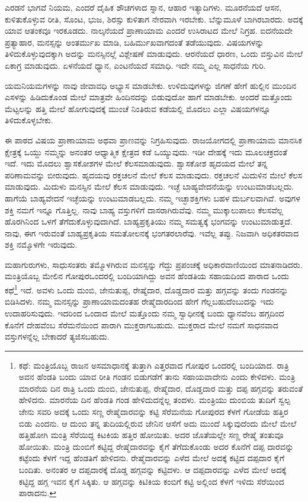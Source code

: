 ಎರಡನೆ ಭಾಗವೆ ನಿಯಮ, ಎಂದರೆ ದೈಹಿಕ ಶೌಚಗಳಾದ ಸ್ನಾನ, ಆಹಾರ ಇತ್ಯಾದಿಗಳು. ಮೂರನೆಯದೆ ಆಸನ, ಕುಳಿತುಕೊಳ್ಳುವ ರೀತಿ, ಸೊಂಟ, ಭುಜ, ಶಿರಸ್ಸು ಕುಳಿತಾಗ ನೇರವಾಗಿ ಇರಬೇಕು. ಬೆನ್ನುಮೂಳೆ ಬಾಗಿರಬಾರದು. ಅದಕ್ಕೆ ಯಾವ ಆತಂಕವೂ ಇರಕೂಡದು. ನಾಲ್ಕನೆಯದೆ ಪ್ರಾಣಾಯಾಮ ಎಂದರೆ ಉಸಿರಾಟದ ಮೇಲೆ ನಿಗ್ರಹ. ಐದನೆಯದೇ ಪ್ರತ್ಯಾಹಾರ, ಮನಸ್ಸನ್ನು ಅಂತರ್ಮುಖ ಮಾಡಿ, ಬಹಿರ್ಮುಖವಾಗದಂತೆ ತಡೆಯುವುದು. ವಿಷಯಗಳನ್ನು ತಿಳಿದುಕೊಳ್ಳುವುದಕ್ಕಾಗಿ ಅದನ್ನು ಮನಸ್ಸಿನಲ್ಲೆ ವಿಶ್ಲೇಷಣೆ ಮಾಡುವುದು. ಆರನೆಯದೆ ಧಾರಣ, ಒಂದು ವಸ್ತುವಿನ ಮೇಲೆ ಏಕಾಗ್ರ ಮಾಡುವುದು. ಏಳನೆಯದೆ ಧ್ಯಾನ, ಎಂಟನೆಯದೆ ಸಮಾಧಿ. ಇದೇ ನಮ್ಮ ಎಲ್ಲ ಸಾಧನೆಯ ಗುರಿ.

\vskip 2pt

ಯಮನಿಯಮಗಳನ್ನು ನಾವು ಜೀವಾವಧಿ ಅಭ್ಯಾಸ ಮಾಡಬೇಕು. ಉಳಿದುವುಗಳನ್ನು ಜಿಗಣೆ ಹೇಗೆ ಹುಲ್ಲಿನ ಮುಂದಿನ ಎಸಳನ್ನು ಹಿಡಿದುಕೊಂಡ ಮೇಲೆ ಮಾತ್ರವೇ ಹಿಂದಿನದನ್ನು ಬಿಡುವುದೋ ಹಾಗೆ ಮಾಡಬೇಕು. ಅಂದರೆ ಮತ್ತೊಂದು ಮೆಟ್ಟಲನ್ನು ಹತ್ತಿ ಮೇಲೆ ಹೋಗುವುದಕ್ಕೆ ಮುಂಚೆ ನಿಂತಿರುವ ಕಡೆಯಲ್ಲಿ ಮೊದಲು ಎಲ್ಲಾ ವಿಷಯಗಳನ್ನೂ ತಿಳಿದುಕೊಳ್ಳಬೇಕು.

\vskip 2pt

ಈ ಪಾಠದ ವಿಷಯ ಪ್ರಾಣಾಯಾಮ ಅಥವಾ ಪ್ರಾಣವನ್ನು ನಿಗ್ರಹಿಸುವುದು. ರಾಜಯೋಗದಲ್ಲಿ ಪ್ರಾಣಾಯಾಮ ಮಾನಸಿಕ ಕ್ಷೇತ್ರಕ್ಕೆ ಒಯ್ದು ನಮ್ಮನ್ನು ಅನಂತರ ಆಧ್ಯಾತ್ಮಿಕ ಕ್ಷೇತ್ರದ ಕಡೆ ಒಯ್ಯುವುದು. ಇಡೀ ದೇಹಕ್ಕೆ ಇದು ಮೂಲಚಕ್ರದಂತೆ ಇದೆ. ಇದು ಮೊದಲು ಶ್ವಾಸಕೋಶಗಳ ಮೇಲೆ ಕೆಲಸಮಾಡುವುದು. ಶ್ವಾಸಕೋಶ ಹೃದಯದ ಮೇಲೆ ತನ್ನ ಪರಿಣಾಮವನ್ನು ಬೀರುವುದು. ಹೃದಯವು ರಕ್ತಚಲನೆ ಮೇಲೆ ಕೆಲಸ ಮಾಡುವುದು. ರಕ್ತಚಲನೆ ಮಿದುಳಿನ ಮೇಲೆ ಕೆಲಸ ಮಾಡುವುದು. ಮಿದುಳು ಮನಸ್ಸಿನ ಮೇಲೆ ಕೆಲಸ ಮಾಡುವುದು. ಇಚ್ಛೆ ಬಾಹ್ಯವೇದನೆಯನ್ನು ಉಂಟುಮಾಡಬಲ್ಲದು. ಹಾಗೆಯೆ ಬಾಹ್ಯವೇದನೆ ಇಚ್ಛೆಯನ್ನು ಉಂಟುಮಾಡಬಲ್ಲದು. ನಮ್ಮ ಇಚ್ಛಾಶಕ್ತಿಗಳು ಬಹಳ ದುರ್ಬಲವಾಗಿವೆ. ಅವುಗಳ ಶಕ್ತಿ ನಮಗೆ ಇನ್ನೂ ಗೊತ್ತಿಲ್ಲ. ನಾವು ಬಾಹ್ಯ ವಸ್ತುಗಳಿಗೆ ದಾಸರಾಗಿರುವೆವು. ನಮ್ಮ ಮುಕ್ಕಾಲುಪಾಲು ಕೆಲಸವೆಲ್ಲ ಹೊರಗಿನಿಂದ ಒಳಗೆ ತೆಗೆದುಕೊಳ್ಳುವುದಾಗಿದೆ. ಬಾಹ್ಯಪ್ರಕೃತಿಯು ನಮ್ಮ ಸಮತ್ವಕ್ಕೆ ಭಂಗವನ್ನು ಉಂಟುಮಾಡುತ್ತದೆ. ನಾವು, ಈಗ ಇರುವಂತೆ ಬಾಹ್ಯಪ್ರಕೃತಿಯ ಸಮತೋಲನಕ್ಕೆ ಭಂಗತರಲಾರೆವು. ಇವೆಲ್ಲ ತಪ್ಪು. ನಿಜವಾಗಿ ಅಧಿಕತರವಾದ ಶಕ್ತಿ ನಮ್ಮೊಳಗೇ ಇರುವುದು.

\vskip 2pt

ಮಹಾಗುರುಗಳು, ಸಾಧುಸಂತರು ತಮ್ಮೊಳಗಿರುವ ಮನಸ್ಸನ್ನು ಗೆದ್ದು ಪ್ರಪಂಚಕ್ಕೆ ಅಧಿಕಾರವಾಣಿಯಿಂದ ಮಾತನಾಡಿದರು. ಮಂತ್ರಿಯೊಬ್ಬ ಮೇಲಿನ ಗೋಪುರ\break ಒಂದರಲ್ಲಿ ಬಂದಿಯಾಗಿದ್ದು ಅವನ ಹೆಂಡತಿಯ ಸಹಾಯದಿಂದ ಪಾರಾದ ಒಂದು ಕಥೆ\footnote{ಕಥೆ: ಮಂತ್ರಿಯೊಬ್ಬ ರಾಜನ ಅಸಮಾಧಾನಕ್ಕೆ ತುತ್ತಾಗಿ ಎತ್ತರವಾದ ಗೋಪುರ ಒಂದರಲ್ಲಿ ಬಂದಿಯಾದ. ರಾತ್ರಿ ಅವನ ಹೆಂಡತಿ ಬಂದು ಯಾವ ರೀತಿ ಗಂಡನ ಬಿಡುಗಡೆಗೆ ತಾನು ಸಹಾಯವಾದೇನು ಎಂದು ಕೇಳಿದಳು. ಮಂತ್ರಿ ಮಾರನೆಯ ದಿನ ರಾತ್ರಿ ಒಂದು ದುಂಬಿ, ಜೇನುತುಪ್ಪ, ರೇಷ್ಮೆದಾರ, ದೊಡ್ಡದಾರ ಮತ್ತು ದಪ್ಪ ಹಗ್ಗವನ್ನು ತರುವಂತೆ ಹೇಳಿದನು. ಮಾರನೆಯ ದಿನ ಹೆಂಡತಿ ಗಂಡ ಹೇಳಿದುದನ್ನೆಲ್ಲ ತಂದಳು. ಮಂತ್ರಿಯು ದುಂಬಿಯ ತುದಿಗೆ ಸ್ವಲ್ಪ ಜೇನು ಸವರಿ ಅದಕ್ಕೆ ಒಂದು ಸಣ್ಣ ರೇಷ್ಮೆದಾರವನ್ನು ಕಟ್ಟಿ ಸೆರೆಮನೆಯ ಗೋಪುರದ ಕೆಳಗೆ ಗೋಡೆಯ ಹತ್ತಿರ ಬಿಡು ಎಂದನು. ಆ ದುಂಬಿ ತನ್ನ ತುದಿಯಲ್ಲಿರುವ ಜೇನಿನ ಆಸೆಗೆ ಅದು ಮುಂದೆ ಸಿಕ್ಕುವುದೆಂದು ಮೇಲೆ ಮೇಲೆ ಹತ್ತಿಹೋಗಿ ಮಂತ್ರಿ ಸೆರೆಯಿದ್ದ ಕಿಟಕಿಯ ಹತ್ತಿರ ಹೋಯಿತು. ಅದರ ಜೊತೆಯಲ್ಲೇ ಸಣ್ಣ ರೇಷ್ಮೆ ತಂತುವೂ ಹೋಯಿತು. ಮಂತ್ರಿ ದುಂಬಿಗೆ ಕಟ್ಟಿದ್ದ ರೇಷ್ಮೆದಾರವನ್ನು ಕೈಗೆ ತೆಗೆದುಕೊಂಡು ಅದರ ಕೊನೆಗೆ ದಪ್ಪ ದಾರವನ್ನು ಕಟ್ಟೆಂದು ಕೆಳಗೆ ಇದ್ದ ಹೆಂಡತಿಗೆ ಹೇಳಿದನು. ರೇಷ್ಮೆದಾರವನ್ನು ಎಳೆದ ಮೇಲೆ ಅದಕ್ಕೆ ಕಟ್ಟಿದ ದಪ್ಪದಾರ ಕೈಗೆ ಬಂದಿತು. ಅನಂತರ ಆ ದಪ್ಪದಾರಕ್ಕೆ ದೊಡ್ಡ ಹಗ್ಗವನ್ನು ಕಟ್ಟಿದಳು. ಆ ದಪ್ಪದಾರವನ್ನು ಎಳೆದ ಮೇಲೆ ಅದಕ್ಕೆ ಕಟ್ಟಿದ್ದ ಹಗ್ಗ ಇವನ ಕೈಗೆ ಸಿಕ್ಕಿತು. ಆ ಹಗ್ಗವನ್ನು ಕಿಟಿಕಿಯ ಕಂಬಿಗೆ ಕಟ್ಟಿ ಅಲ್ಲಿಂದ ಕೆಳಗೆ ಇಳಿದು ಸೆರೆಯಿಂದ ಪಾರಾದನು.} ಇದೆ. ಅವಳು ಒಂದು ದುಂಬಿ, ಜೇನುತುಪ್ಪ, ರೇಷ್ಮೆದಾರ, ದೊಡ್ಡದಾರ ಮತ್ತು ಹಗ್ಗವನ್ನು ತಂದು ಗಂಡನನ್ನು ಬಿಡಿಸಿದಳು. ನಮ್ಮ ಮನಸ್ಸನ್ನು ಪ್ರಾಣಾಯಾಮದಂತಹ ರೇಷ್ಮೆದಾರದಿಂದ ಹೇಗೆ ಗೆಲ್ಲಬಹುದೆಂಬುದನ್ನು ಇದು ಉದಾಹರಿಸುವುದು. ಇದರಿಂದ ಒಂದಾದ ಮೇಲೆ ಮತ್ತೊಂದು ನಮ್ಮ ಸ್ವಾಧೀನಕ್ಕೆ ಬಂದು ಧ್ಯಾನವೆಂಬ ಹಗ್ಗದಿಂದ ಕೊನೆಗೆ ದೇಹವೆಂಬ ಸೆರೆಮನೆಯಿಂದ ಪಾರಾಗಿ ಮುಕ್ತರಾಗಬಹುದು. ಮುಕ್ತರಾದ ಮೇಲೆ ನಮಗೆ ಸಾಧನವಾದ ವಸ್ತುಗಳನ್ನೆಲ್ಲ ಬೇಕಾದರೆ ತ್ಯಜಿಸಬಹುದು.

